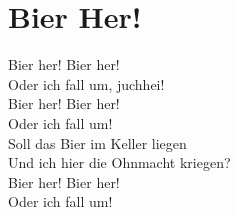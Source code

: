 \section{Bier Her!}
Bier her! Bier her! \\
Oder ich fall um, juchhei!\\
Bier her! Bier her!\\
Oder ich fall um!\\
Soll das Bier im Keller liegen\\
Und ich hier die Ohnmacht kriegen?\\
Bier her! Bier her!\\
Oder ich fall um! 
